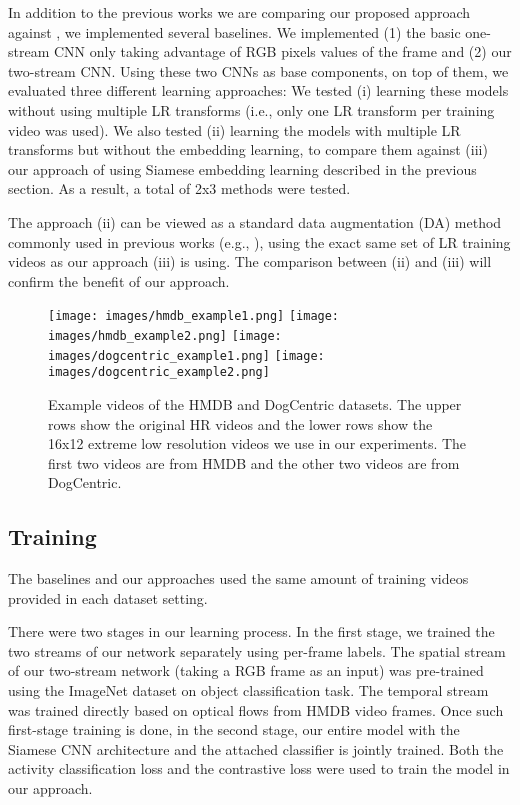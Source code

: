 \documentclass[letterpaper]{article} %
\begin{document}
In addition to the previous works we are comparing our proposed approach against \cite{ryoo17privacy,chen17}, we implemented several baselines. We implemented (1) the basic one-stream CNN only taking advantage of RGB pixels values of the frame and (2) our two-stream CNN. Using these two CNNs as base components, on top of them, we evaluated three different learning approaches: We tested (i) learning these models without using multiple LR transforms (i.e., only one LR transform per training video was used). We also tested (ii) learning the models with multiple LR transforms but without the embedding learning, to compare them against (iii) our approach of using Siamese embedding learning described in the previous section. As a result, a total of 2x3 methods were tested.

The approach (ii) can be viewed as a standard data augmentation (DA) method commonly used in previous works (e.g., \cite{karpathy14}), using the exact same set of LR training videos as our approach (iii) is using. The comparison between (ii) and (iii) will confirm the benefit of our approach.



\begin{figure}
\begin{center}
   \texttt{[image: images/hmdb\_example1.png]}
   \texttt{[image: images/hmdb\_example2.png]}
   \texttt{[image: images/dogcentric\_example1.png]}
   \texttt{[image: images/dogcentric\_example2.png]}
\end{center}
   \caption{Example videos of the HMDB and DogCentric datasets. The upper rows show the original HR videos and the lower rows show the 16x12 extreme low resolution videos we use in our experiments. The first two videos are from HMDB and the other two videos are from DogCentric.}
\label{fig:videos}		
\end{figure}


\subsection{Training}

The baselines and our approaches used the same amount of training videos provided in each dataset setting.

There were two stages in our learning process. In the first stage, we trained the two streams of our network separately using per-frame labels. The spatial stream of our two-stream network (taking a RGB frame as an input) was pre-trained using the ImageNet dataset on object classification task. The temporal stream was trained directly based on optical flows from HMDB video frames. Once such first-stage training is done, in the second stage, our entire model with the Siamese CNN architecture and the attached classifier is jointly trained. Both the activity classification loss and the contrastive loss were used to train the model in our approach.
\end{document}
